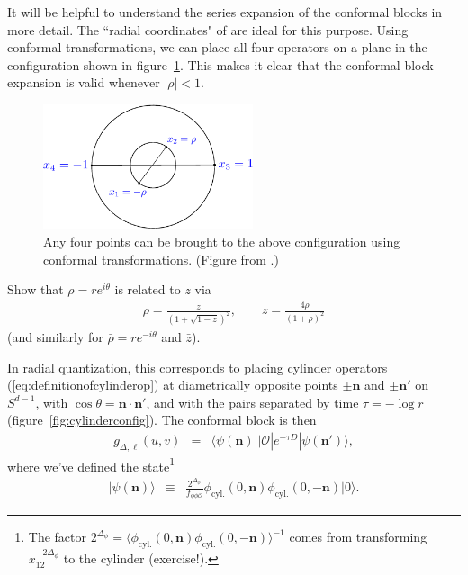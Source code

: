 \documentclass[12pt]{article}
\numberwithin{equation}{section}
\newcommand\be{\begin{eqnarray}}
\newcommand\ee{\end{eqnarray}}
\newcommand\f\phi
\newcommand\cO{\mathcal{O}}
\newcommand\<\langle
\renewcommand\>\rangle
\renewcommand\.{\cdot}
\newcommand\De{\Delta}
\newcommand\bn{\mathbf{n}}
\renewcommand\th{\theta}
\begin{document}
It will be helpful to understand the series expansion of the conformal blocks in more detail.
 The ``radial coordinates" of \cite{Pappadopulo:2012jk,Hogervorst:2013sma} are ideal for this purpose.
 Using conformal transformations, we can place all four operators on a plane in the configuration shown in figure~\ref{fig:rho}.  This makes it clear that the conformal block expansion is valid whenever $|\rho|<1$.

\begin{figure}
\begin{center}
\includegraphics[width=0.55\textwidth]{fig-rho}
\end{center}
\caption{Any four points can be brought to the above configuration using conformal transformations. (Figure from \cite{Hogervorst:2013sma}.)  \label{fig:rho}}
\end{figure}

Show that $\rho=re^{i\theta}$ is related to $z$ via
\be
\label{eq:radialcoordinatedefinition}
\rho = \frac{z}{(1+\sqrt{1-z})^2},\qquad z = \frac{4\rho}{(1+\rho)^2}
\ee
(and similarly for $\bar\rho=r e^{-i\theta}$ and $\bar z$).

In radial quantization, this corresponds to placing cylinder operators (\ref{eq:definitionofcylinderop}) at diametrically opposite points $\pm \bn$ and $\pm \bn'$ on $S^{d-1}$, with $\cos\th=\bn\.\bn'$, and with the pairs separated by time $\tau=-\log r$ (figure~\ref{fig:cylinderconfig}).  The conformal block is then
\be
\label{eq:blockintermsofpsi}
 g_{\De,\ell}(u,v) &=& \<\psi(\bn)||\cO|e^{-\tau D}|\psi(\bn')\>,
\ee
where we've defined the state\footnote{The factor $2^{\De_\f}=\<\f_\mathrm{cyl.}(0,\bn)\f_\mathrm{cyl.}(0,-\bn)\>^{-1}$ comes from transforming $x_{12}^{-2\De_\f}$ to the cylinder (exercise!).}
\be
|\psi(\bn)\> &\equiv& \frac{2^{\De_\f}}{f_{\f\f\cO}}\phi_\mathrm{cyl.}(0,\bn)\phi_\mathrm{cyl.}(0,-\bn)|0\>.
\ee
\end{document}

